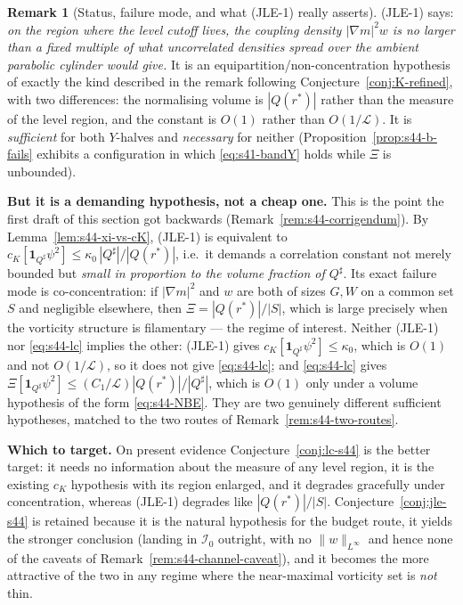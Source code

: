 \documentclass[11pt]{article}
\theoremstyle{definition}
\newtheorem{remark}[theorem]{Remark}
\theoremstyle{remark}
\begin{document}
\begin{remark}[Status, failure mode, and what (JLE-1) really asserts]
  \label{rem:s44-jle-status}
  (JLE-1) says: \emph{on the region where the level cutoff lives, the coupling
  density $|\nabla m|^2w$ is no larger than a fixed multiple of what
  uncorrelated densities spread over the ambient parabolic cylinder would
  give.} It is an equipartition/non-concentration hypothesis of exactly the
  kind described in the remark following
  Conjecture~\ref{conj:K-refined}, with two differences: the normalising
  volume is $|Q(r^*)|$ rather than the measure of the level region, and the
  constant is $O(1)$ rather than $O(1/\mathcal{L})$. It is \emph{sufficient}
  for both $Y$-halves and \emph{necessary} for neither
  (Proposition~\ref{prop:s44-b-fails} exhibits a configuration in which
  \eqref{eq:s41-bandY} holds while $\Xi$ is unbounded).

  \medskip
  \noindent\textbf{But it is a demanding hypothesis, not a cheap one.} This is
  the point the first draft of this section got backwards
  (Remark~\ref{rem:s44-corrigendum}). By Lemma~\ref{lem:s44-xi-vs-cK},
  (JLE-1) is equivalent to
  $c_K[\mathbf{1}_{Q^\sharp}\psi^2]\leq\kappa_0\,|Q^\sharp|/|Q(r^*)|$, i.e.\ it
  demands a correlation constant not merely bounded but \emph{small in
  proportion to the volume fraction of $Q^\sharp$}. Its exact failure mode is
  co-concentration: if $|\nabla m|^2$ and $w$ are both of sizes $G,W$ on a
  common set $S$ and negligible elsewhere, then $\Xi=|Q(r^*)|/|S|$, which is
  large precisely when the vorticity structure is filamentary --- the regime
  of interest. Neither (JLE-1) nor \eqref{eq:s44-lc} implies the other:
  (JLE-1) gives $c_K[\mathbf{1}_{Q^\sharp}\psi^2]\leq\kappa_0$, which is
  $O(1)$ and not $O(1/\mathcal{L})$, so it does not give \eqref{eq:s44-lc};
  and \eqref{eq:s44-lc} gives
  $\Xi[\mathbf{1}_{Q^\sharp}\psi^2]\leq(C_1/\mathcal{L})|Q(r^*)|/|Q^\sharp|$,
  which is $O(1)$ only under a volume hypothesis of the form
  \eqref{eq:s44-NBE}. They are two genuinely different sufficient hypotheses,
  matched to the two routes of Remark~\ref{rem:s44-two-routes}.

  \medskip
  \noindent\textbf{Which to target.} On present evidence
  Conjecture~\ref{conj:lc-s44} is the better target: it needs no information
  about the measure of any level region, it is the existing $c_K$ hypothesis
  with its region enlarged, and it degrades gracefully under concentration,
  whereas (JLE-1) degrades like $|Q(r^*)|/|S|$. Conjecture~\ref{conj:jle-s44}
  is retained because it is the natural hypothesis for the budget route, it
  yields the stronger conclusion (landing in $\mathcal{I}_0$ outright, with no
  $\|w\|_{L^\infty}$ and hence none of the caveats of
  Remark~\ref{rem:s44-channel-caveat}), and it becomes the more attractive of
  the two in any regime where the near-maximal vorticity set is \emph{not}
  thin.
\end{remark}
\end{document}
